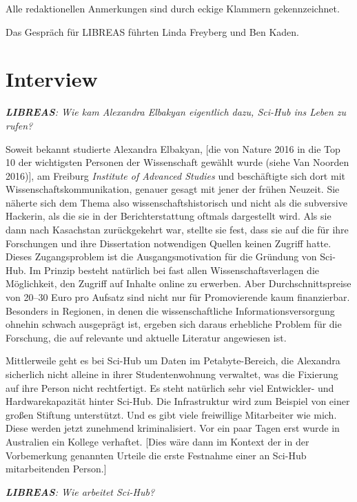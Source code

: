 \documentclass[a4paper,
fontsize=11pt,
oneside,
numbers=noperiodatend,
parskip=half-,
bibliography=totoc,
final
]{scrartcl}
\begin{document}
Alle redaktionellen Anmerkungen sind durch eckige Klammern
gekennzeichnet.

Das Gespräch für LIBREAS führten Linda Freyberg und Ben Kaden.

\hypertarget{interview}{%
\section*{Interview}\label{interview}}

\emph{\textbf{LIBREAS}: Wie kam Alexandra Elbakyan eigentlich dazu,
Sci-Hub ins Leben zu rufen?}

Soweit bekannt studierte Alexandra Elbakyan, {[}die von Nature 2016 in
die Top 10 der wichtigsten Personen der Wissenschaft gewählt wurde
(siehe Van Noorden 2016){]}, am Freiburg \emph{Institute of Advanced
Studies} und beschäftigte sich dort mit Wissenschaftskommunikation,
genauer gesagt mit jener der frühen Neuzeit. Sie näherte sich dem Thema
also wissenschaftshistorisch und nicht als die subversive Hackerin, als
die sie in der Berichterstattung oftmals dargestellt wird. Als sie dann
nach Kasachstan zurückgekehrt war, stellte sie fest, dass sie auf die
für ihre Forschungen und ihre Dissertation notwendigen Quellen keinen
Zugriff hatte. Dieses Zugangsproblem ist die Ausgangsmotivation für die
Gründung von Sci-Hub. Im Prinzip besteht natürlich bei fast allen
Wissenschaftsverlagen die Möglichkeit, den Zugriff auf Inhalte online zu
erwerben. Aber Durchschnittspreise von 20--30 Euro pro Aufsatz sind
nicht nur für Promovierende kaum finanzierbar. Besonders in Regionen, in
denen die wissenschaftliche Informationsversorgung ohnehin schwach
ausgeprägt ist, ergeben sich daraus erhebliche Problem für die
Forschung, die auf relevante und aktuelle Literatur angewiesen ist.

Mittlerweile geht es bei Sci-Hub um Daten im Petabyte-Bereich, die
Alexandra sicherlich nicht alleine in ihrer Studentenwohnung verwaltet,
was die Fixierung auf ihre Person nicht rechtfertigt. Es steht natürlich
sehr viel Entwickler- und Hardwarekapazität hinter Sci-Hub. Die
Infrastruktur wird zum Beispiel von einer großen Stiftung unterstützt.
Und es gibt viele freiwillige Mitarbeiter wie mich. Diese werden jetzt
zunehmend kriminalisiert. Vor ein paar Tagen erst wurde in Australien
ein Kollege verhaftet. {[}Dies wäre dann im Kontext der in der
Vorbemerkung genannten Urteile die erste Festnahme einer an Sci-Hub
mitarbeitenden Person.{]}

\emph{\textbf{LIBREAS}: Wie arbeitet Sci-Hub?}
\end{document}
